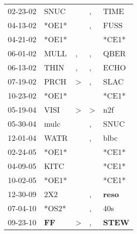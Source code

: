 \begin{supertabular}{p{0.07\textwidth}p{0.06\textwidth}p{0.02\textwidth}p{0.02\textwidth}p{0.06\textwidth}}
 02-23-02\textsuperscript{} &         SNUC\textsuperscript{} &               &             , &           TIME\textsuperscript{} \\
 04-13-02\textsuperscript{} &                          *OE1* &               &             , &           FUSS\textsuperscript{} \\
 04-21-02\textsuperscript{} &                          *OE1* &               &               &                            *CE1* \\
 06-01-02\textsuperscript{} &         MULL\textsuperscript{} &             , &             , &           QBER\textsuperscript{} \\
 06-13-02\textsuperscript{} &         THIN\textsuperscript{} &             , &             , &           ECHO\textsuperscript{} \\
 07-19-02\textsuperscript{} &         PRCH\textsuperscript{} &  \textgreater &             , &           SLAC\textsuperscript{} \\
 10-23-02\textsuperscript{} &                          *OE1* &               &               &                            *CE1* \\
 05-19-04\textsuperscript{} &         VISI\textsuperscript{} &  \textgreater &  \textgreater &            n2f\textsuperscript{} \\
 05-30-04\textsuperscript{} &         mulc\textsuperscript{} &               &             , &           SNUC\textsuperscript{} \\
 12-01-04\textsuperscript{} &         WATR\textsuperscript{} &               &             , &           blbc\textsuperscript{} \\
 02-24-05\textsuperscript{} &                          *OE1* &               &               &                            *CE1* \\
 04-09-05\textsuperscript{} &         KITC\textsuperscript{} &               &               &                            *CE1* \\
 10-02-05\textsuperscript{} &                          *OE1* &               &               &                            *CE1* \\
 12-30-09\textsuperscript{} &          2X2\textsuperscript{} &               &             , &  \textbf{reso\textsuperscript{}} \\
 07-04-10\textsuperscript{} &                          *OS2* &               &             , &            40s\textsuperscript{} \\
 09-23-10\textsuperscript{} &  \textbf{FF\textsuperscript{}} &  \textgreater &             , &  \textbf{STEW\textsuperscript{}} \\

\end{supertabular}
